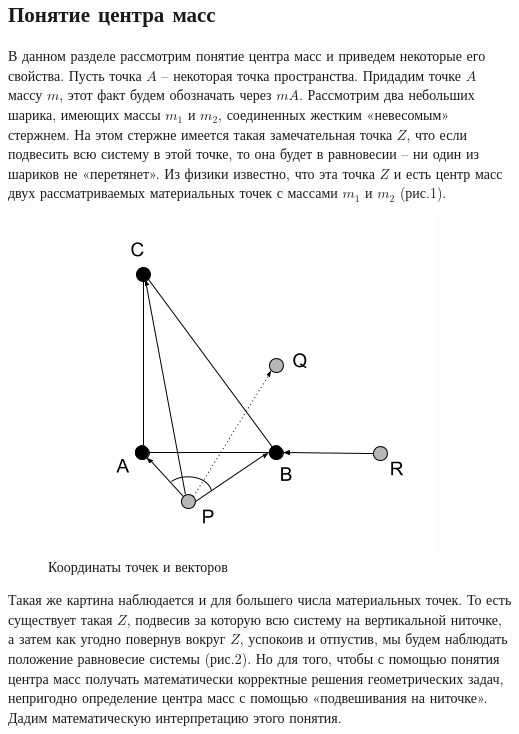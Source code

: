 \documentclass[a4paper,12pt]{article}
\theoremstyle{plain} %
\numberwithin{equation}{section}
\theoremstyle{definition} %
\theoremstyle{remark} %
\begin{document}
\subsection{Понятие центра масс}
В данном разделе рассмотрим понятие центра масс и приведем некоторые его свойства. Пусть точка $A$ -- некоторая точка пространства. Придадим точке $A$ массу $m$, этот факт будем обозначать через $mA$.
Рассмотрим два небольших шарика, имеющих массы $m_1$ и $m_2$, соединенных жестким «невесомым» стержнем. На этом стержне имеется такая замечательная точка $Z$, что если подвесить всю систему в этой точке, то она будет в равновесии -- ни один из шариков не «перетянет». Из физики известно, что эта точка $Z$ и есть центр масс двух рассматриваемых материальных точек с массами $m_1$ и $m_2$ (рис.1). 
\begin{figure} 
\vspace{-5ex}
\includegraphics[width=\linewidth]{img/геометрия.png}
\caption{Координаты точек и векторов}
\label{fig:somelabel}
\end{figure}
Такая же картина наблюдается и для большего числа материальных точек. То есть существует такая $Z$, подвесив за которую всю систему на вертикальной ниточке, а затем как угодно повернув вокруг $Z$, успокоив и отпустив, мы будем наблюдать положение равновесие системы (рис.2).
Но для того, чтобы с помощью понятия центра масс получать математически корректные решения геометрических задач, непригодно определение центра масс с помощью «подвешивания на ниточке». Дадим математическую интерпретацию этого понятия. 
\end{document}
